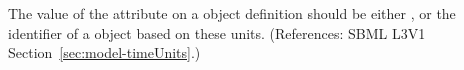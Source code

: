 The value of the  attribute on a \Model object definition
should be either ,  or the identifier of a
\UnitDefinition object based on these units.  (References: SBML L3V1
Section~\ref{sec:model-timeUnits}.)
